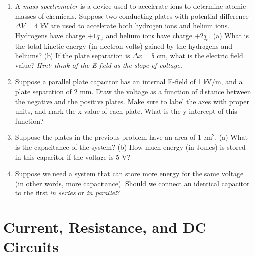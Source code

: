 \documentclass[10pt]{article}
\begin{document}
\begin{enumerate}
\item A \textit{mass spectrometer} is a device used to accelerate ions to determine atomic masses of chemicals.  Suppose two conducting plates with potential difference $\Delta V = 4$ kV are used to accelerate both hydrogen ions and helium ions.  Hydrogens have charge $+1 q_e$, and helium ions have charge $+2 q_e$.  (a) What is the total kinetic energy (in electron-volts) gained by the hydrogens and heliums? (b) If the plate separation is $\Delta x = 5$ cm, what is the electric field value?  \textit{Hint: think of the E-field as the slope of voltage.} \\ \vspace{3cm}
\item Suppose a parallel plate capacitor has an internal E-field of 1 kV/m, and a plate separation of 2 mm.  Draw the voltage as a function of distance between the negative and the positive plates.  Make sure to label the axes with proper units, and mark the x-value of each plate.  What is the y-intercept of this function? \\ \vspace{2cm}
\item Suppose the plates in the previous problem have an area of 1 cm$^2$.  (a) What is the capacitance of the system? (b) How much energy (in Joules) is stored in this capacitor if the voltage is 5 V?
\item Suppose we need a system that can store more energy for the same voltage (in other words, more capacitance).  Should we connect an identical capacitor to the first \textit{in series} or \textit{in parallel}?  \\ \vspace{1cm}
\end{enumerate}

\section{Current, Resistance, and DC Circuits}
\end{document}
